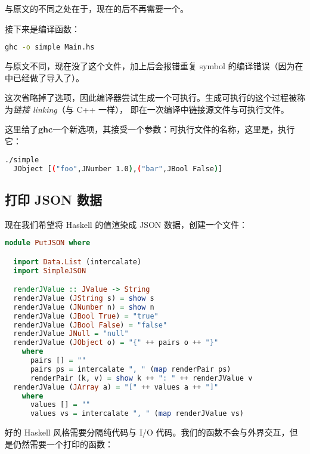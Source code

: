 \documentclass[./main.tex]{subfiles}
\begin{document}
与原文的不同之处在于，现在的后不再需要一个\acode{()}。

接下来是编译函数：

\begin{lstlisting}[language=Bash]
  ghc -o simple Main.hs
\end{lstlisting}

与原文不同，现在没了这个文件，加上后会报错重复
symbol 的编译错误（因为在中已经做了导入了）。

这次省略掉了选项，因此编译器尝试生成一个可执行。生成可执行的这个过程被称为\textit{链接 linking}（与 C++ 一样），
即在一次编译中链接源文件与可执行文件。

这里给了\textbf{ghc}一个新选项，其接受一个参数：可执行文件的名称，这里是，执行它：

\begin{lstlisting}[language=Bash]
  ./simple
  JObject [("foo",JNumber 1.0),("bar",JBool False)]
\end{lstlisting}

\subsection*{打印 JSON 数据}

现在我们希望将 Haskell 的值渲染成 JSON 数据，创建一个文件：

\begin{lstlisting}[language=Haskell]
  module PutJSON where

  import Data.List (intercalate)
  import SimpleJSON

  renderJValue :: JValue -> String
  renderJValue (JString s) = show s
  renderJValue (JNumber n) = show n
  renderJValue (JBool True) = "true"
  renderJValue (JBool False) = "false"
  renderJValue JNull = "null"
  renderJValue (JObject o) = "{" ++ pairs o ++ "}"
    where
      pairs [] = ""
      pairs ps = intercalate ", " (map renderPair ps)
      renderPair (k, v) = show k ++ ": " ++ renderJValue v
  renderJValue (JArray a) = "[" ++ values a ++ "]"
    where
      values [] = ""
      values vs = intercalate ", " (map renderJValue vs)
\end{lstlisting}

好的 Haskell 风格需要分隔纯代码与 I/O 代码。我们的函数不会与外界交互，但是仍然需要一个打印的函数：
\end{document}
